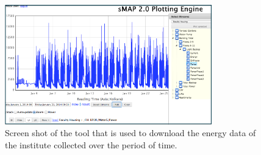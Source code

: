 \documentclass[conference]{IEEEtran}
\begin{document}
\begin{itemize}
\begin{figure}[t]
\centering
\includegraphics[width=0.8\textwidth,height=0.35\textheight]{screenshot.png}
\caption{Screen shot of the tool that is used to download the energy data of the institute collected over the period of time.}
\label{fig:screenshot}
\end{figure}


%
%
%
%
%
%
 
\end{itemize}
\end{document}
